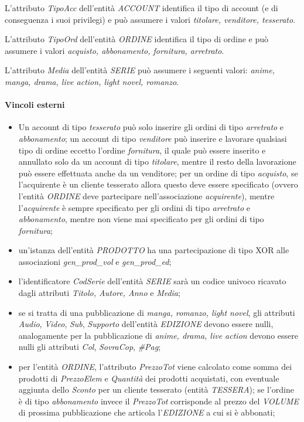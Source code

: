 \documentclass[a4paper]{scrartcl}
\begin{document}
\begin{footnotesize}
L'attributo \textit{TipoAcc} dell'entità \textit{ACCOUNT} identifica il tipo di account (e di conseguenza i suoi privilegi) e può assumere i valori \textit{titolare, venditore, tesserato}.

L'attributo \textit{TipoOrd} dell'entità \textit{ORDINE} identifica il tipo di ordine e può assumere i valori \textit{acquisto, abbonamento, fornitura, arretrato}.

L'attributo \textit{Media} dell'entità \textit{SERIE} può assumere i seguenti valori: \textit{anime, manga, drama, live action, light novel, romanzo}.

\paragraph*{Vincoli esterni}
\begin{itemize}
\item Un account di tipo \textit{tesserato} può solo inserire gli ordini di tipo \textit{arretrato} e \textit{abbonamento}; un account di tipo \textit{venditore} può inserire e lavorare qualsiasi tipo di ordine eccetto l'ordine \textit{fornitura}, il quale può essere inserito e annullato solo da un account di tipo \textit{titolare}, mentre il resto della lavorazione può essere effettuata anche da un venditore; per un ordine di tipo \textit{acquisto}, se l'acquirente è un cliente tesserato allora questo deve essere specificato (ovvero l'entità \textit{ORDINE} deve partecipare nell'associazione \textit{acquirente}), mentre l'\textit{acquirente} è sempre specificato per gli ordini di tipo \textit{arretrato} e \textit{abbonamento}, mentre non viene mai specificato per gli ordini di tipo \textit{fornitura};
\item un'istanza dell'entità \textit{PRODOTTO} ha una partecipazione di tipo XOR alle associazioni \textit{gen\_{prod}\_{vol}} e \textit{gen\_{prod}\_{ed}};
\item l'identificatore \textit{CodSerie} dell'entità \textit{SERIE} sarà un codice univoco ricavato dagli attributi \textit{Titolo, Autore, Anno} e \textit{Media};
\item se si tratta di una pubblicazione di \textit{manga, romanzo, light novel}, gli attributi \textit{Audio}, \textit{Video}, \textit{Sub}, \textit{Supporto} dell'entità \textit{EDIZIONE} devono essere nulli, analogamente per la pubblicazione di \textit{anime, drama, live action} devono essere nulli gli attributi \textit{Col}, \textit{SovraCop}, \textit{{\#}Pag};
\item per l'entità \textit{ORDINE}, l'attributo \textit{PrezzoTot} viene calcolato come somma dei prodotti di \textit{PrezzoElem} e \textit{Quantità} dei prodotti acquistati, con eventuale aggiunta dello \textit{Sconto} per un cliente tesserato (entità \textit{TESSERA}); se l'ordine è di tipo \textit{abbonamento} invece il \textit{PrezzoTot} corrisponde al prezzo del \textit{VOLUME} di prossima pubblicazione che articola l'\textit{EDIZIONE} a cui si è abbonati;

\end{itemize}
\end{footnotesize}
\end{document}

